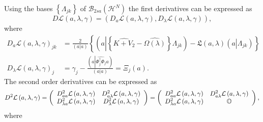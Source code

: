 \documentclass[aps,preprint]{revtex4}%
\begin{document}
Using the bases $\left\{  \Lambda_{jk}\right\}  $ of $\mathcal{B}_{2sa}\left(
\mathcal{H}^{N}\right)  $ the first derivatives can be expressed as
\begin{equation}
D\mathcal{L}\left(  a,\lambda,\gamma\right)  =\left(  D_{a}\mathcal{L}\left(
a,\lambda,\gamma\right)  ,D_{\lambda}\mathcal{L}\left(  a,\lambda
,\gamma\right)  \right)  ,
\end{equation}
where
\begin{align}
D_{a}\mathcal{L}\left(  a,\lambda,\gamma\right)  _{jk}  &  =\frac{2}{\left(
a\left\vert a\right.  \right)  }\left\{  \left(  a\left\vert \left\{
\widehat{K+V_{2}}-\widehat{\Omega\left(  \lambda\right)  }\right\}  \right.
\Lambda_{jk}\right)  -\mathfrak{L}\left(  a,\lambda\right)  \left(
a\left\vert \overset{}{\Lambda_{jk}}\right.  \right)  \right\} \nonumber\\
D_{\lambda}\mathcal{L}\left(  a,\lambda,\gamma\right)  _{j}  &  =\gamma
_{j}-\frac{\left(  a\left\vert \widehat{\Phi_{j}^{\dagger}\Phi_{j}}\right.
a\right)  }{\left(  a\left\vert \overset{}{a}\right.  \right)  }=\Xi
_{j}\left(  a\right)  .
\end{align}
The second order derivatives can be expressed as%
\begin{equation}
D^{2}\mathcal{L}\left(  a,\lambda,\gamma\right)  =\left(
\begin{array}
[c]{cc}%
D_{aa}^{2}\mathcal{L}\left(  a,\lambda,\gamma\right)  & D_{a\lambda}%
^{2}\mathcal{L}\left(  a,\lambda,\gamma\right) \\
D_{\lambda a}^{2}\mathcal{L}\left(  a,\lambda,\gamma\right)  & D_{\lambda}%
^{2}\mathcal{L}\left(  a,\lambda,\gamma\right)
\end{array}
\right)  =\left(
\begin{array}
[c]{cc}%
D_{aa}^{2}\mathcal{L}\left(  a,\lambda,\gamma\right)  & D_{a\lambda}%
^{2}\mathcal{L}\left(  a,\lambda,\gamma\right) \\
D_{\lambda a}^{2}\mathcal{L}\left(  a,\lambda,\gamma\right)  & \mathbb{O}%
\end{array}
\right)  ,
\end{equation}
where
\end{document}
